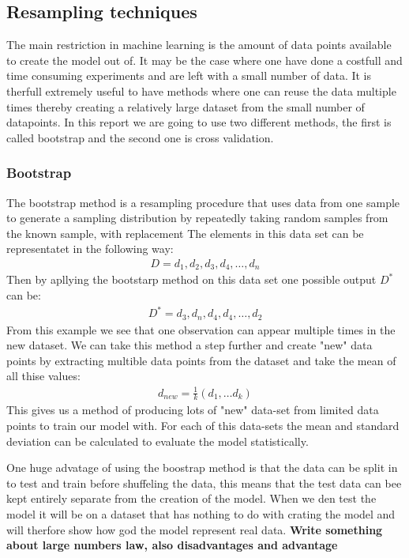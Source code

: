 \subsection{Resampling techniques}

\noindent The main restriction in machine learning is 
the amount of data points available to create the model out of. It may be the case where one have
done a costfull and time consuming experiments and are left with a small number of data. 
It is therfull extremely useful to have methods where one can reuse the data multiple times
thereby creating a relatively large dataset from the small number of datapoints. In this report
we are going to use two different methods, the first is called bootstrap and the second one is cross validation.

\subsubsection{Bootstrap} 
\noindent The bootstrap method is a resampling procedure that uses data from one 
sample to generate a sampling distribution by repeatedly taking random 
samples from the known sample, with replacement %
The elements in this data set can be representatet in the following way:
\begin{align}
    D = {d_1, d_2, d_3, d_4, \dots, d_n}
\end{align}
Then by apllying the bootstarp method on this data set one possible output $D^{*}$ can be:
\begin{align}
    D^{*} = {d_3, d_n, d_4, d_4 , \dots, d_2}
\end{align}
From this example we see that one observation can appear multiple times in the new dataset.
We can take this method a step further and create "new" data points by extracting multible data points from 
the dataset and take the mean of all thise values:
\begin{align}
    d_{new} = \frac{1}{k}(d_1, \dots d_k)
\end{align}
This gives us a method of producing lots of "new" data-set from 
limited data points to train our model with. For each of this data-sets
the mean and standard deviation can be calculated to evaluate the model statistically. %


One huge advatage of using the boostrap method is that the data can be split in to 
test and train before shuffeling the data, this means that the test data can bee kept 
entirely separate from the creation of the model. When we den test the model it will
be on a dataset that has nothing to do with crating the model and will therfore show
how god the model represent real data. 
\textbf{Write something about large numbers law, also disadvantages and advantage}



